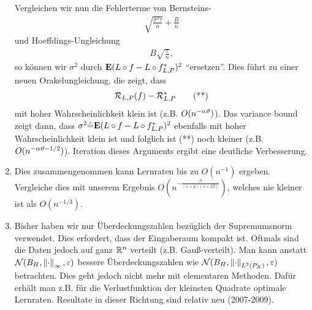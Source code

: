 \begin{bem*}[Bemkerungen.]
\begin{bemenum}
\begin{enumerate}[label=\arabic{*}.),leftmargin=2pt]
Vergleichen wir nun die Fehlerterme von Bernsteins-
\begin{align*}
\sqrt{\frac{\sigma^2 \tau}{n}} + \frac{B}{n}
\end{align*}
und Hoeffdings-Ungleichung
\begin{align*}
B\sqrt{\frac{\tau}{n}},
\end{align*}
so können wir $\sigma^2$ durch $\textbf{E} (L\circ f  - L\circ f_{L,P}^*)^2$
"`ersetzen"'. Dies führt zu einer neuen Orakelungleichung, die zeigt, dass
\begin{align*}
\mathcal{R}_{L,P}(f)-\mathcal{R}_{L,P}^*\tag{**}
\end{align*}
mit hoher Wahrscheinlichkeit klein ist (z.B. $O(n^{-\alpha\vartheta})$). Das variance
bound zeigt dann, dass $\sigma^2 \hat{=} \textbf{E} (L\circ f  - L\circ f_{L,P}^*)^2$
ebenfalls mit hoher Wahrscheinlichkeit klein ist und folglich ist (**) noch
kleiner (z.B. $O(n^{-\alpha\vartheta-1/2})$). Iteration dieses Arguments ergibt eine
deutliche Verbesserung.
\item Dies zusammengenommen kann Lernraten bis zu $O(n^{-1})$ ergeben.
Vergleiche  dies mit unserem Ergebnis
$O(n^{-\frac{\beta}{(1+p)(1+2\beta)}})$, welches nie kleiner ist als
$O(n^{-1/3})$.
\item Bisher haben wir nur Überdeckungszahlen bezüglich der Supremumsnorm
verwendet. Dies erfordert, dass der Eingaberaum kompakt ist.
Oftmals sind die Daten jedoch auf ganz $\mathbb{R}^n$ verteilt (z.B.
Gauß-verteilt).
Man kann anstatt $\mathcal{N}(B_H,\left\|\cdot\right\|_\infty,\varepsilon)$ bessere Überdeckungszahlen
wie $\mathcal{N}(B_H,\left\|\cdot\right\|_{L^2(P_X)},\varepsilon)$ betrachten. Dies geht jedoch nicht
mehr mit elementaren Methoden. Dafür erhält man z.B. für die Verlustfunktion der
kleinsten Quadrate optimale Lernraten. Resultate in dieser Richtung sind relativ
neu (2007-2009).\maphere
\end{enumerate}
\end{bemenum}
\end{bem*}
